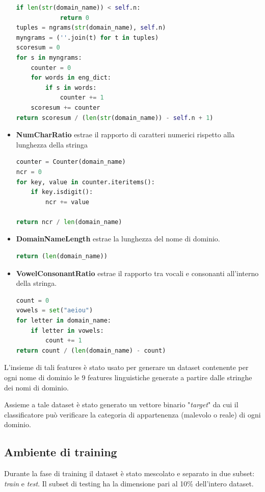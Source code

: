 \begin{itemize}
\begin{lstlisting}[language=Python]
if len(str(domain_name)) < self.n:
            return 0
tuples = ngrams(str(domain_name), self.n)
myngrams = (''.join(t) for t in tuples)
scoresum = 0
for s in myngrams:
	counter = 0
    for words in eng_dict:
    	if s in words:
        	counter += 1
    scoresum += counter
return scoresum / (len(str(domain_name)) - self.n + 1)
\end{lstlisting}

\item \textbf{NumCharRatio} estrae il rapporto di caratteri numerici rispetto alla lunghezza della stringa

\begin{lstlisting}[language=Python]
counter = Counter(domain_name)
ncr = 0
for key, value in counter.iteritems():
	if key.isdigit():
		ncr += value

return ncr / len(domain_name)
\end{lstlisting}

\item \textbf{DomainNameLength} estrae la lunghezza del nome di dominio.

\begin{lstlisting}[language=Python]
return (len(domain_name))
\end{lstlisting}

\item \textbf{VowelConsonantRatio} estrae il rapporto tra vocali e consonanti all'interno della stringa.

\begin{lstlisting}[language=Python]
count = 0
vowels = set("aeiou")
for letter in domain_name:
	if letter in vowels:
		count += 1
return count / (len(domain_name) - count)
\end{lstlisting}

\end{itemize}

L'insieme di tali features è stato usato per generare un dataset contenente per ogni nome di dominio le 9 features linguistiche generate a partire dalle stringhe dei nomi di dominio. 

Assieme a tale dataset è stato generato un vettore binario "\textit{target}" da cui il classificatore può verificare la categoria di appartenenza (malevolo o reale) di ogni dominio.

\subsection{Ambiente di training}
Durante la fase di training il dataset è stato mescolato e separato in due subset: \textit{train} e \textit{test}. Il subset di testing ha la dimensione pari al 10\% dell'intero dataset. 

